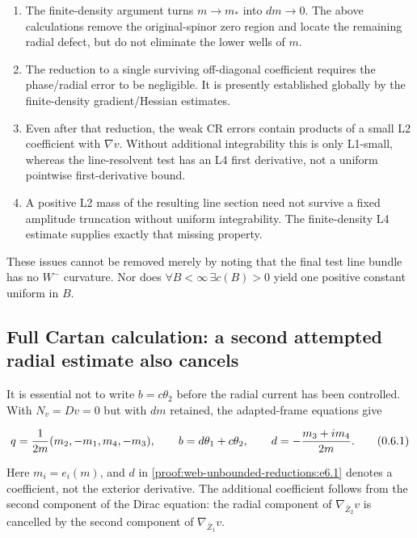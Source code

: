 \begin{enumerate}
\def\labelenumi{\arabic{enumi}.}
\tightlist
\item
  The finite-density argument turns \(m\to m_*\) into \(dm\to0\). The above calculations remove the original-spinor zero region and locate the remaining radial defect, but do not eliminate the lower wells of \(m\).
\item
  The reduction to a single surviving off-diagonal coefficient requires the phase/radial error to be negligible. It is presently established globally by the finite-density gradient/Hessian estimates.
\item
  Even after that reduction, the weak CR errors contain products of a small L2 coefficient with \(\nabla v\). Without additional integrability this is only L1-small, whereas the line-resolvent test has an L4 first derivative, not a uniform pointwise first-derivative bound.
\item
  A positive L2 mass of the resulting line section need not survive a fixed amplitude truncation without uniform integrability. The finite-density L4 estimate supplies exactly that missing property.
\end{enumerate}

These issues cannot be removed merely by noting that the final test line bundle has no \(W^-\) curvature. Nor does \(\forall B<\infty\,\exists c(B)>0\) yield one positive constant uniform in \(B\).

\hypertarget{proof:web-unbounded-reductions:s6}{%
\subsection{Full Cartan calculation: a second attempted radial estimate also cancels}\label{proof:web-unbounded-reductions:s6}}

It is essential not to write \(b=c\theta_2\) before the radial current has been controlled. With \(N_v=Dv=0\) but with \(dm\) retained, the adapted-frame equations give

\[
 q={1\over2m}(m_2,-m_1,m_4,-m_3),
 \qquad
 b=d\theta_1+c\theta_2,
 \qquad
 d=-{m_3+im_4\over2m}.
 \tag{\thesection.6.1}\label{proof:web-unbounded-reductions:e6.1}
\]

Here \(m_i=e_i(m)\), and \(d\) in \eqref{proof:web-unbounded-reductions:e6.1} denotes a coefficient, not the exterior derivative. The additional coefficient follows from the second component of the Dirac equation: the radial component of \(\nabla_{\bar Z_2}v\) is cancelled by the second component of \(\nabla_{\bar Z_1}v\).

